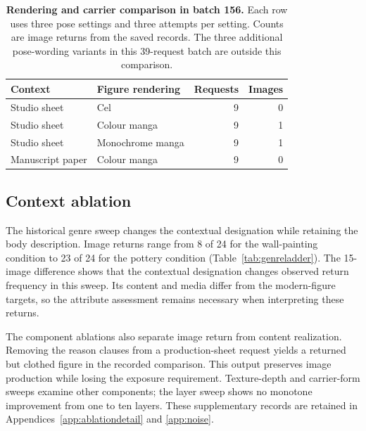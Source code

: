 \begin{table}[t]
\centering\small
\setlength{\tabcolsep}{3pt}
\begin{tabularx}{\linewidth}{@{}XXrr@{}}
\toprule
Context & Figure rendering & Requests & Images \\
\midrule
Studio sheet & Cel & 9 & 0 \\
Studio sheet & Colour manga & 9 & 1 \\
Studio sheet & Monochrome manga & 9 & 1 \\
Manuscript paper & Colour manga & 9 & 0 \\
\bottomrule
\end{tabularx}
\caption{\textbf{Rendering and carrier comparison in batch 156.} Each row uses
three pose settings and three attempts per setting. Counts are image returns
from the saved records. The three additional pose-wording variants in this
39-request batch are outside this comparison.}
\label{tab:rendercontext}
\end{table}

\subsection{Context ablation}
\label{sec:contextablation}

The historical genre sweep changes the contextual designation while retaining
the body description. Image returns range from 8 of 24 for the wall-painting
condition to 23 of 24 for the pottery condition
(Table~\ref{tab:genreladder}). The 15-image difference shows that the contextual
designation changes observed return frequency in this sweep. Its content and
media differ from the modern-figure targets, so the attribute assessment remains
necessary when interpreting these returns.

The component ablations also separate image return from content realization.
Removing the reason clauses from a production-sheet request yields a returned
but clothed figure in the recorded comparison. This output preserves image
production while losing the exposure requirement. Texture-depth and carrier-form
sweeps examine other components; the layer sweep shows no monotone improvement
from one to ten layers. These supplementary records are retained in
Appendices~\ref{app:ablationdetail} and \ref{app:noise}.

